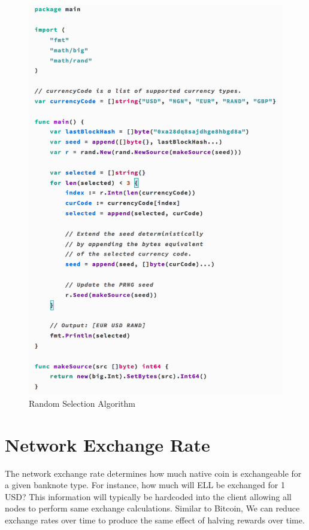 \begin{figure}[H]
  \includegraphics[width=\linewidth]{images/fig3}
  \caption{Random Selection Algorithm}
  \label{fig:select_algo}
\end{figure}
\vspace{3mm}


\section{Network Exchange Rate}

The network exchange rate determines how much native coin is exchangeable for a given banknote type. For instance, how much will ELL be exchanged for 1 USD? This information will typically be hardcoded into the client allowing all nodes to perform same exchange calculations. Similar to Bitcoin, We can reduce exchange rates over time to produce the same effect of halving rewards over time. 




